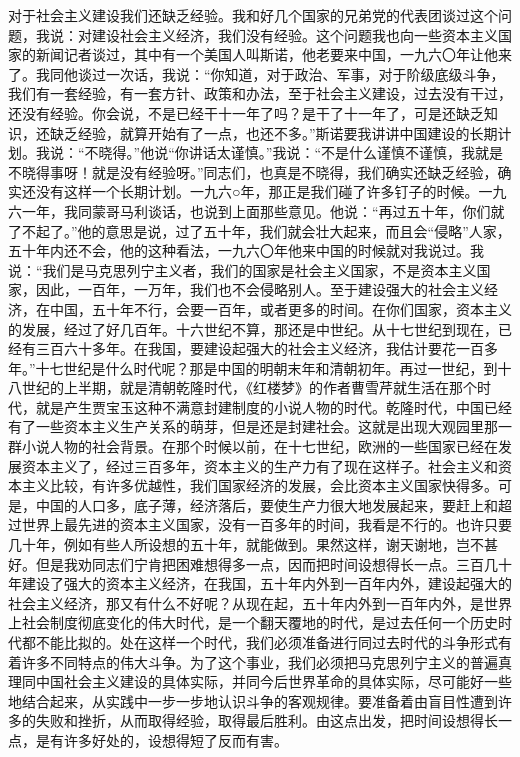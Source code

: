 对于社会主义建设我们还缺乏经验。我和好几个国家的兄弟党的代表团谈过这个问题，我说：对建设社会主义经济，我们没有经验。这个问题我也向一些资本主义国家的新闻记者谈过，其中有一个美国人叫斯诺，他老要来中国，一九六〇年让他来了。我同他谈过一次话，我说：“你知道，对于政治、军事，对于阶级底级斗争，我们有一套经验，有一套方针、政策和办法，至于社会主义建设，过去没有干过，还没有经验。你会说，不是已经干十一年了吗？是干了十一年了，可是还缺乏知识，还缺乏经验，就算开始有了一点，也还不多。”斯诺要我讲讲中国建设的长期计划。我说：“不晓得。”他说“你讲话太谨慎。”我说：“不是什么谨慎不谨慎，我就是不晓得事呀！就是没有经验呀。”同志们，也真是不晓得，我们确实还缺乏经验，确实还没有这样一个长期计划。一九六○年，那正是我们碰了许多钉子的时候。一九六一年，我同蒙哥马利谈话，也说到上面那些意见。他说：“再过五十年，你们就了不起了。”他的意思是说，过了五十年，我们就会壮大起来，而且会“侵略”人家，五十年内还不会，他的这种看法，一九六〇年他来中国的时候就对我说过。我说：“我们是马克思列宁主义者，我们的国家是社会主义国家，不是资本主义国家，因此，一百年，一万年，我们也不会侵略别人。至于建设强大的社会主义经济，在中国，五十年不行，会要一百年，或者更多的时间。在你们国家，资本主义的发展，经过了好几百年。十六世纪不算，那还是中世纪。从十七世纪到现在，已经有三百六十多年。在我国，要建设起强大的社会主义经济，我估计要花一百多年。”十七世纪是什么时代呢？那是中国的明朝末年和清朝初年。再过一世纪，到十八世纪的上半期，就是清朝乾隆时代，《红楼梦》的作者曹雪芹就生活在那个时代，就是产生贾宝玉这种不满意封建制度的小说人物的时代。乾隆时代，中国已经有了一些资本主义生产关系的萌芽，但是还是封建社会。这就是出现大观园里那一群小说人物的社会背景。在那个时候以前，在十七世纪，欧洲的一些国家已经在发展资本主义了，经过三百多年，资本主义的生产力有了现在这样子。社会主义和资本主义比较，有许多优越性，我们国家经济的发展，会比资本主义国家快得多。可是，中国的人口多，底子薄，经济落后，要使生产力很大地发展起来，要赶上和超过世界上最先进的资本主义国家，没有一百多年的时间，我看是不行的。也许只要几十年，例如有些人所设想的五十年，就能做到。果然这样，谢天谢地，岂不甚好。但是我劝同志们宁肯把困难想得多一点，因而把时间设想得长一点。三百几十年建设了强大的资本主义经济，在我国，五十年内外到一百年内外，建设起强大的社会主义经济，那又有什么不好呢？从现在起，五十年内外到一百年内外，是世界上社会制度彻底变化的伟大时代，是一个翻天覆地的时代，是过去任何一个历史时代都不能比拟的。处在这样一个时代，我们必须准备进行同过去时代的斗争形式有着许多不同特点的伟大斗争。为了这个事业，我们必须把马克思列宁主义的普遍真理同中国社会主义建设的具体实际，并同今后世界革命的具体实际，尽可能好一些地结合起来，从实践中一步一步地认识斗争的客观规律。要准备着由盲目性遭到许多的失败和挫折，从而取得经验，取得最后胜利。由这点出发，把时间设想得长一点，是有许多好处的，设想得短了反而有害。

